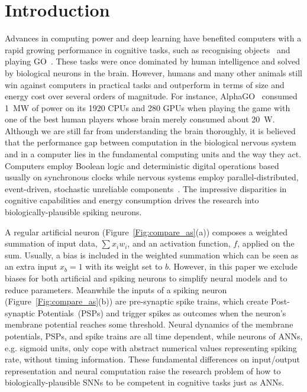 \documentclass{article}
\begin{document}
\section{Introduction}
Advances in computing power and deep learning have benefited computers with a rapid growing performance in cognitive tasks, such as recognising objects~\cite{deng2009imagenet} and playing GO~\cite{silver2016mastering}. 
These tasks were once dominated by human intelligence and solved by biological neurons in the brain.
However, humans and many other animals still win against computers in practical tasks and outperform in terms of size and energy cost over several orders of magnitude.
For instance, AlphaGO~\cite{silver2016mastering} consumed 1~MW of power on its 1920 CPUs and 280 GPUs when playing the game with one of the best human players whose brain merely consumed about 20~W.
Although we are still far from understanding the brain thoroughly, it is believed that the performance gap between computation in the biological nervous system and in a computer lies in the fundamental computing units and the way they act.
Computers employ Boolean logic and deterministic digital operations based usually on synchronous clocks while nervous systems employ parallel-distributed, event-driven, stochastic unreliable components~\cite{indiveri2009artificial}.
The impressive disparities in cognitive capabilities and energy consumption drives the research into biologically-plausible spiking neurons.

A regular artificial neuron (Figure~\ref{Fig:compare_as}(a)) composes a weighted summation of input data, $\sum x_i w_i$, and an activation function, $f$, applied on the sum.
Usually, a bias is included in the weighted summation which can be seen as an extra input $x_b = 1$ with its weight set to $b$.
However, in this paper we exclude biases for both artificial and spiking neurons to simplify neural models and to reduce parameters.
Meanwhile the inputs of a spiking neuron (Figure~\ref{Fig:compare_as}(b)) are pre-synaptic spike trains, which create Post-synaptic Potentials~(PSPs) and trigger spikes as outcomes when the neuron's membrane potential reaches some threshold.
Neural dynamics of the membrane potentials, PSPs, and spike trains are all time dependent, while neurons of ANNs, e.g. sigmoid units, only cope with abstract numerical values representing spiking rate, without timing information.
These fundamental differences on input/output representation and neural computation raise the research problem of how to biologically-plausible SNNs to be competent in cognitive tasks just as ANNs.
\end{document}
